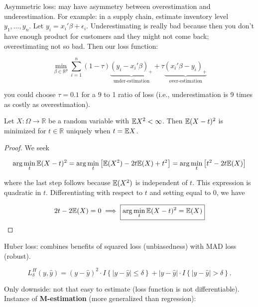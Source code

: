 Asymmetric loss: may have asymmetry between overestimation and underestimation. For example: in a supply chain, estimate inventory level \(y_1, \ldots, y_n\). Let \(y_i = x_i' \beta + \epsilon_i\). Underestimating is really bad because then you don't have enough product for customers and they might not come back; overestimating not so bad. Then our loss function:

\[
\underset{\beta \in \mathbb{R}^p}{\min} \sum_{i=1}^n (1 - \tau) \underbrace{(y_i - x_i' \beta)_+}_{\text{under-estimation}} + \tau \underbrace{ (x_i' \beta - y_i)_+}_{\text{over-estimation}}
\]

you could choose \(\tau = 0.1\) for a 9 to 1 ratio of loss (i.e., underestimation is 9 times as costly as overestimation).

\begin{theorem}\label{exercise6.5}
Let $X:\Omega\to\mathbb{R}$ be a random variable with $\mathbb{E} X^{2}<\infty$. Then $\mathbb{E}(X-t)^{2}$ is minimized for $t\in\mathbb{R}$ uniquely when $t=\mathbb{E} X$.
\end{theorem}

\begin{proof}


We seek

\[
 \arg \min_t \mathbb{E}(X - t)^2 = \arg \min_t \big[ \mathbb{E}(X^2) - 2t\mathbb{E}(X) + t^2 \big] = \arg \min_t \big[  t^2 - 2t\mathbb{E}(X)\big] 
\]

where the last step follows because \(\mathbb{E}(X^2)\) is independent of \(t\). This expression is quadratic in \(t\). Differentiating with respect to \(t\) and setting equal to 0, we have

\[
2t - 2 \mathbb{E}(X) = 0 \implies \boxed{\arg \min_t \mathbb{E}(X - t)^2 = \mathbb{E}(X)}
\]

\end{proof}

Huber loss: combines benefits of squared loss (unbiasedness) with MAD loss (robust).

\[
L_\delta^H(y, \hat{y}) = ( y - \hat{y})^2 \cdot I \left\{  |y - \hat{y}| \leq \delta \right\} 
+ | y - \hat{y}| \cdot I \left\{  |y - \hat{y}| > \delta \right\}.
\]

Only downside: not that easy to estimate (loss function is not differentiable). Instance of \textbf{M-estimation} (more generalized than regression):

